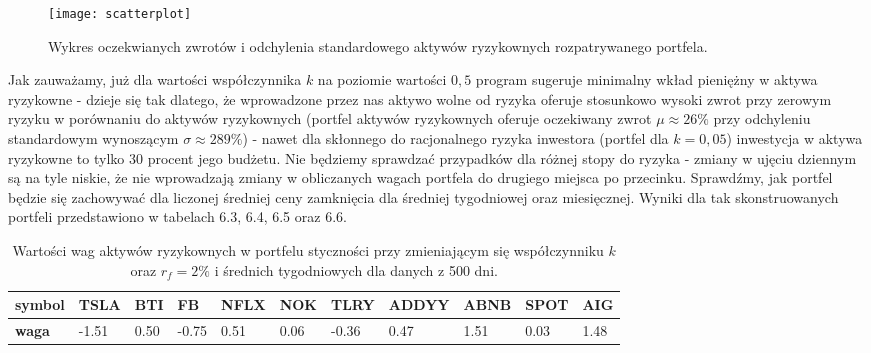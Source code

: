 \documentclass[magister]{dyplom}
\begin{document}
\begin{figure}[ht]
	\centering
	\texttt{[image: scatterplot]}
	\caption{Wykres oczekwianych zwrotów i odchylenia standardowego aktywów ryzykownych rozpatrywanego portfela.}
\end{figure}
\newpage
Jak zauważamy, już dla wartości współczynnika $k$ na poziomie wartości $0,5$ program sugeruje minimalny wkład pieniężny w aktywa ryzykowne - dzieje się tak dlatego, że wprowadzone przez nas aktywo wolne od ryzyka oferuje stosunkowo wysoki zwrot przy zerowym ryzyku w porównaniu do aktywów ryzykownych (portfel aktywów ryzykownych oferuje oczekiwany zwrot $\mu \approx 26\%$ przy odchyleniu standardowym wynoszącym $\sigma \approx 289\%$) - nawet dla skłonnego do racjonalnego ryzyka inwestora (portfel dla $k = 0,05$) inwestycja w aktywa ryzykowne to tylko 30 procent jego budżetu. Nie będziemy sprawdzać przypadków dla różnej stopy do ryzyka - zmiany w ujęciu dziennym są na tyle niskie, że nie wprowadzają zmiany w obliczanych wagach portfela do drugiego miejsca po przecinku. Sprawdźmy, jak portfel będzie się zachowywać dla liczonej średniej ceny zamknięcia dla średniej tygodniowej oraz miesięcznej. Wyniki dla tak skonstruowanych portfeli przedstawiono w tabelach 6.3, 6.4, 6.5 oraz 6.6.
\begin{table}[ht]
	\centering
	\caption{Wartości wag aktywów ryzykownych w portfelu styczności przy zmieniającym się współczynniku $k$ oraz $r_f = 2\%$ i średnich tygodniowych dla danych z 500 dni.}
	\begin{tabular}{|l|l|l|l|l|l|l|l|l|l|l|}
		\hline
		\textbf{symbol} & \textbf{TSLA} & \textbf{BTI} & \textbf{FB} & \textbf{NFLX} & \textbf{NOK} & \textbf{TLRY} & \textbf{ADDYY} & \textbf{ABNB} & \textbf{SPOT} & \textbf{AIG} \\ \hline
		\textbf{waga}   & -1.51       & 0.50          & -0.75           & 0.51        & 0.06         & -0.36         & 0.47        & 1.51          & 0.03          & 1.48        \\ \hline
	\end{tabular}
\end{table}
\end{document}
